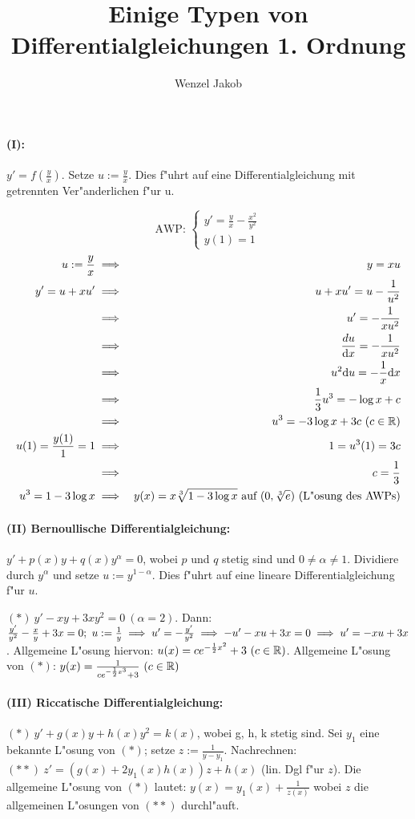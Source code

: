 \documentclass{article}
\title{Einige Typen von Differentialgleichungen 1. Ordnung}
\author{Wenzel Jakob}
\begin{document}
\maketitle

\paragraph{(I): }$y'=f(\frac{y}{x})$. Setze $u:=\frac{y}{x}$. Dies f"uhrt auf eine Differentialgleichung mit getrennten Ver"anderlichen f"ur u.

\begin{beispiel}
$$\text{AWP: }\begin{cases}y'=\frac{y}{x}-\frac{x^2}{y^2}\\ y(1)=1\end{cases}$$
\begin{eqnarray*}
u:=\frac{y}{x}&\implies&y=xu\\
y'=u+xu'&\implies&u+xu'=u-\frac{1}{u^2}\\
&\implies& u'=-\frac{1}{xu^2}\\
&\implies& \frac{du}{\mathrm{d} x}=-\frac{1}{xu^2}\\
&\implies& u^2\mathrm{d} u=-\frac{1}{x}\mathrm{d} x\\
&\implies& \frac{1}{3}u^3=-\log x+c\\
&\implies& u^3=-3\log x+3c\ (c\in\mathbb{R})\\
u(1)=\frac{y(1)}{1}=1 & \implies & 1=u^3(1)=3c\\
&\implies &c=\frac{1}{3}\\
u^3=1-3\log x&\implies& y(x)=x\sqrt[3]{1-3\log x}\text{ auf }(0, \sqrt[3]{e})\text{ (L"osung des AWPs)}
\end{eqnarray*}
\end{beispiel}

\paragraph{(II) Bernoullische Differentialgleichung: }
$y'+p(x)y+q(x)y^\alpha=0$, wobei $p$ und $q$ stetig sind und $0\ne\alpha\ne 1$.
Dividiere durch $y^\alpha$ und setze $u:=y^{1-\alpha}$. Dies f"uhrt auf eine
lineare Differentialgleichung f"ur $u$.

\begin{beispiel}
$(*)\ y'-xy+3xy^2=0\ (\alpha=2)$. Dann: $\frac{y'}{y^2}-\frac{x}{y}+3x=0;\ 
u:=\frac{1}{y}\folgt u'=-\frac{y'}{y^2}\folgt -u'-xu+3x=0\folgt u'=-xu+3x$. Allgemeine L"osung hiervon:
$u(x)=ce^{-\frac{1}{2}x^2}+3\ (c\in\mathbb{R})$. Allgemeine L"osung von $(*)$:
$y(x)=\frac{1}{ce^{-\frac{1}{2}x^3}+3}\ (c\in\MdR)$
\end{beispiel}

\paragraph{(III) Riccatische Differentialgleichung: }
$(*)\ y'+g(x)y+h(x)y^2=k(x)$, wobei g, h, k stetig sind.
Sei $y_1$ eine bekannte L"osung von $(*)$; setze $z:=\frac{1}{y-y_1}$.
Nachrechnen: $(**)\ z'=(g(x)+2y_1(x)h(x))z+h(x)$ (lin. Dgl f"ur $z$). Die
allgemeine L"osung von $(*)$ lautet: $y(x)=y_1(x)+\frac{1}{z(x)}$ wobei
$z$ die allgemeinen L"osungen von $(**)$ durchl"auft.
\end{document}
